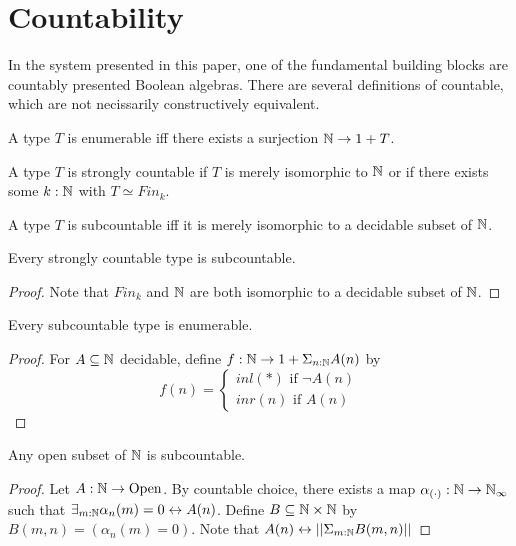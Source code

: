 \section{Countability}\label{CountabilityDiscussion}
In the system presented in this paper, 
one of the fundamental building blocks are countably presented Boolean algebras. 
There are several definitions of countable, which are not necissarily constructively equivalent. 

\begin{definition}
  A type $T$ is enumerable iff there exists a surjection $\mathbb{N} \to 1 + T$. 
\end{definition}
\begin{definition}
  A type $T$ is strongly countable if
  $T$ is merely isomorphic to $\mathbb{N}$ or if 
  there exists some $k:\mathbb{N}$ with $T \simeq Fin_k$.%
\end{definition}
\begin{definition}
  A type $T$ is subcountable iff it is merely isomorphic to a decidable subset of $\mathbb{N}$. 
\end{definition}

\begin{lemma}
  Every strongly countable type is subcountable. 
\end{lemma}
\begin{proof}
  Note that $Fin_k$ and $\mathbb{N}$ are both isomorphic to a decidable subset of $\mathbb{N}$. 
\end{proof}
\begin{lemma}
  Every subcountable type is enumerable. 
\end{lemma}
\begin{proof}
  For $A\subseteq \mathbb{N}$ decidable, define $f:\mathbb{N} \to 1 + \Sigma_{n:\mathbb{N}} A(n)$ by 
  $$
  f(n) = 
  \begin{cases}
    inl(*) \text{ if } \neg A(n)\\
    inr(n) \text{ if } A(n)
  \end{cases}
  $$
\end{proof} 


\begin{lemma}\label{OpenSubsetNAreSubCountable}
  Any open subset of $\mathbb{N}$ is subcountable. 
\end{lemma} 
\begin{proof}
  Let $A:\mathbb{N} \to \mathrm{Open}$. 
  By countable choice, there exists a map $\alpha_{(\cdot)}:\mathbb{N} \to \mathbb{N}_{\infty}$ such that 
  $\exists_{m:\mathbb{N}} \alpha_n(m) = 0 \leftrightarrow A (n)$. 
  Define $B\subseteq \mathbb{N} \times \mathbb{N}$ by 
  $B(m,n) = (\alpha_{n}(m) = 0)$. 
  Note that $A(n) \leftrightarrow || \Sigma_{m:\mathbb{N} } B(m,n) ||$
\end{proof}

